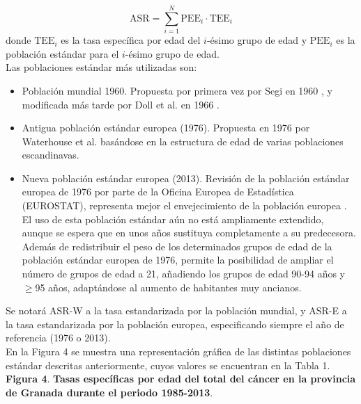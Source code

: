 $$\text{ASR} = \sum_{i = 1}^{N} \text{PEE}_i \cdot \text{TEE}_i$$ donde $\text{TEE}_i$ es la tasa específica por edad del $i$-ésimo grupo de edad y $\text{PEE}_i$ es la población estándar para el $i$-ésimo grupo de edad.\\

\noindent Las poblaciones estándar más utilizadas son:
\begin{itemize}
	\item Población mundial 1960. Propuesta por primera vez por Segi en 1960 \cite{SegiM.1960}, y modificada más tarde por Doll et al. en 1966 \cite{Doll1966}.
	\item Antigua población estándar europea (1976). Propuesta en 1976 por Waterhouse et al.  \cite{Waterhouse1976} basándose en la estructura de edad de varias poblaciones escandinavas.
	\item Nueva población estándar europea (2013). Revisión de la población estándar europea de 1976 por parte de la Oficina Europea de Estadística (EUROSTAT), representa mejor el envejecimiento de la población europea \cite{EUROSTAT2013}. El uso de esta población estándar aún no está ampliamente extendido, aunque se espera que en unos años sustituya completamente a su predecesora. Además de redistribuir el peso de los determinados grupos de edad de la población estándar europea de 1976, permite la posibilidad de ampliar el número de grupos de edad a 21, añadiendo los grupos de edad 90-94 años y $\geq$95 años, adaptándose al aumento de habitantes muy ancianos.
\end{itemize}

\noindent Se notará ASR-W a la tasa estandarizada por la población mundial, y ASR-E a la tasa estandarizada por la población europea, especificando siempre el año de referencia (1976 o 2013).\\

\noindent En la Figura 4 se muestra una representación gráfica de las distintas poblaciones estándar descritas anteriormente, cuyos valores se encuentran en la Tabla 1.\\

\noindent \textbf{Figura 4}. \textbf{Tasas específicas por edad del total del cáncer en la provincia de Granada durante el periodo 1985-2013}. \\

